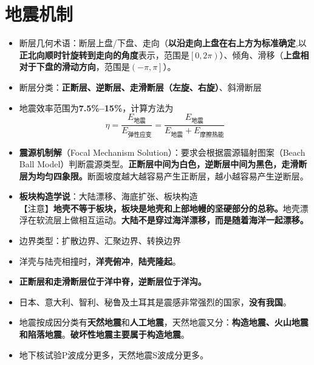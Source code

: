\documentclass[twoside,titlepage,hyperref,UTF8,12pt]{ctexart}
\begin{document}
\section{地震机制}
\begin{itemize}
    \item 断层几何术语：断层上盘/下盘、走向（\textbf{以沿走向上盘在右上方为标准确定},以\textbf{正北向顺时针旋转到走向的角度}表示，范围是$\left [0, 2\pi \right )$）、倾角、滑移（\textbf{上盘相对于下盘的滑动方向}，范围是$\left (-\pi, \pi\right ]$）。
    \item 断层分类：\textbf{正断层、逆断层、走滑断层（左旋、右旋）}、斜滑断层
    \item 地震效率范围为\textbf{7.5\%--15\%}，计算方法为
        \begin{equation}
            \eta = \frac{E_{\text{地震}}}{E_{\text{弹性应变}}} = \frac{E_{\text{地震}}}{E_{\text{地震}} + E_{\text{摩擦热能}}}
        \end{equation}
    \item \textbf{震源机制解}（Focal Mechanism Solution）：要求会根据震源辐射图案（Beach Ball Model）判断震源类型。\textbf{正断层中间为白色，逆断层中间为黑色，走滑断层为均匀四象限。}断面坡度越大越容易产生正断层，越小越容易产生逆断层。
    \item \textbf{板块构造学说}：大陆漂移、海底扩张、板块构造\\
        【注意】\textbf{地壳不等于板块，板块是地壳和上部地幔的坚硬部分的总称。}地壳漂浮在软流层上做相互运动。\textbf{大陆不是穿过海洋漂移，而是随着海洋一起漂移。}
    \item 边界类型：扩散边界、汇聚边界、转换边界
    \item 洋壳与陆壳相撞时，\textbf{洋壳俯冲}，\textbf{陆壳隆起}。
    \item \textbf{正断层和走滑断层位于洋中脊，逆断层位于洋沟。}
    \item 日本、意大利、智利、秘鲁及土耳其是震感非常强烈的国家，\textbf{没有我国}。
    \item 地震按成因分类有\textbf{天然地震}和\textbf{人工地震}，天然地震又分：\textbf{构造地震、火山地震和陷落地震}。\textbf{破坏性地震主要属于构造地震}。
    \item 地下核试验P波成分更多，天然地震S波成分更多。
\end{itemize}
\end{document}
